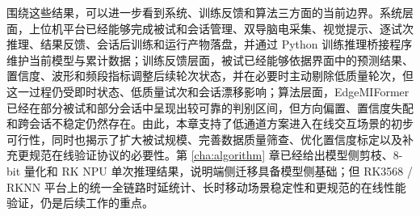 围绕这些结果，可以进一步看到系统、训练反馈和算法三方面的当前边界。系统层面，上位机平台已经能够完成被试和会话管理、双导脑电采集、视觉提示、逐试次推理、结果反馈、会话后训练和运行产物落盘，并通过 Python 训练推理桥接程序维护当前模型与累计数据；训练反馈层面，被试已经能够依据界面中的预测结果、置信度、波形和频段指标调整后续轮次状态，并在必要时主动剔除低质量轮次，但这一过程仍受即时状态、低质量试次和会话漂移影响；算法层面，EdgeMIFormer 已经在部分被试和部分会话中呈现出较可靠的判别区间，但方向偏置、置信度失配和跨会话不稳定仍然存在。由此，本章支持了低通道方案进入在线交互场景的初步可行性，同时也揭示了扩大被试规模、完善数据质量筛查、优化置信度标定以及补充更规范在线验证协议的必要性。第 \ref{cha:algorithm} 章已经给出模型侧剪枝、8-bit 量化和 RK NPU 单次推理结果，说明端侧迁移具备模型侧基础；但 RK3568 / RKNN 平台上的统一全链路时延统计、长时移动场景稳定性和更规范的在线性能验证，仍是后续工作的重点。
